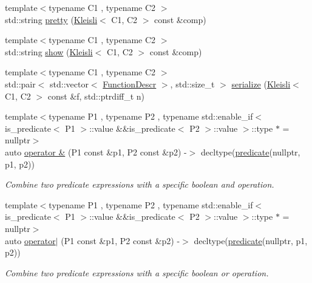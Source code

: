 \begin{DoxyCompactItemize}
\item 
{\footnotesize template$<$typename C1 , typename C2 $>$ }\\std\+::string \hyperlink{namespacepfq_1_1lang_a11d127d1c25e1628bc76dd2067467dcd}{pretty} (\hyperlink{structpfq_1_1lang_1_1Kleisli}{Kleisli}$<$ C1, C2 $>$ const \&comp)
\item 
{\footnotesize template$<$typename C1 , typename C2 $>$ }\\std\+::string \hyperlink{namespacepfq_1_1lang_aecdf72ea1b9163a219332275af8c81f2}{show} (\hyperlink{structpfq_1_1lang_1_1Kleisli}{Kleisli}$<$ C1, C2 $>$ const \&comp)
\item 
{\footnotesize template$<$typename C1 , typename C2 $>$ }\\std\+::pair$<$ std\+::vector$<$ \hyperlink{structpfq_1_1lang_1_1FunctionDescr}{Function\+Descr} $>$, std\+::size\+\_\+t $>$ \hyperlink{namespacepfq_1_1lang_ac064e0b32cebb9c8f7073ba87a840d42}{serialize} (\hyperlink{structpfq_1_1lang_1_1Kleisli}{Kleisli}$<$ C1, C2 $>$ const \&f, std\+::ptrdiff\+\_\+t n)
\item 
{\footnotesize template$<$typename P1 , typename P2 , typename std\+::enable\+\_\+if$<$ is\+\_\+predicate$<$ P1 $>$\+::value \&\&is\+\_\+predicate$<$ P2 $>$\+::value $>$\+::type $\ast$  = nullptr$>$ }\\auto \hyperlink{namespacepfq_1_1lang_a0697233877c06151b1ea7247ed24a9cb}{operator \&} (P1 const \&p1, P2 const \&p2) -\/$>$ decltype(\hyperlink{namespacepfq_1_1lang_aca9adafc436b7f851621b979fa1aaf88}{predicate}(nullptr, p1, p2))
\begin{DoxyCompactList}\small\item\em Combine two predicate expressions with a specific boolean \textquotesingle{}and\textquotesingle{} operation. \end{DoxyCompactList}\item 
{\footnotesize template$<$typename P1 , typename P2 , typename std\+::enable\+\_\+if$<$ is\+\_\+predicate$<$ P1 $>$\+::value \&\&is\+\_\+predicate$<$ P2 $>$\+::value $>$\+::type $\ast$  = nullptr$>$ }\\auto \hyperlink{namespacepfq_1_1lang_a425bb535884185450da7addcdb47f35b}{operator$\vert$} (P1 const \&p1, P2 const \&p2) -\/$>$ decltype(\hyperlink{namespacepfq_1_1lang_aca9adafc436b7f851621b979fa1aaf88}{predicate}(nullptr, p1, p2))
\begin{DoxyCompactList}\small\item\em Combine two predicate expressions with a specific boolean \textquotesingle{}or\textquotesingle{} operation. \end{DoxyCompactList}\item 

\end{DoxyCompactItemize}
